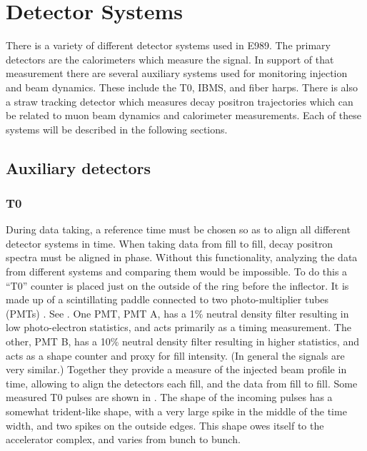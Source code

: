 
\thispagestyle{myheadings}

\graphicspath{{Body/Figures/ExperimentalOverview/Auxiliary/}{Body/Figures/ExperimentalOverview/Calorimeter/}{Body/Figures/ExperimentalOverview/Ring/}{Body/Figures/TrackingFigures/TrackerPics/}{Body/Figures/ExperimentalOverview/Ring/}{Body/Figures/TrackingFigures/CoordSys/}{Body/Figures/TrackingFigures/Drift/}{Body/Figures/TrackingFigures/Electronics/}}

\chapter{Detector Systems}
\label{sec:DetectorSystems}

There is a variety of different detector systems used in E989. The primary detectors are the calorimeters which measure the \wa signal. In support of that measurement there are several auxiliary systems used for monitoring injection and beam dynamics. These include the T0, IBMS, and fiber harps. There is also a straw tracking detector which measures decay positron trajectories which can be related to muon beam dynamics and calorimeter measurements. Each of these systems will be described in the following sections.



\section{Auxiliary detectors}

\subsection{T0}
\label{sec:T0}

During data taking, a reference time must be chosen so as to align all different detector systems in time. When taking data from fill to fill, decay positron spectra must be aligned in phase. Without this functionality, analyzing the data from different systems and comparing them would be impossible. To do this a ``T0'' counter is placed just on the outside of the ring before the inflector. It is made up of a scintillating paddle connected to two photo-multiplier tubes (PMTs) \cite{t0Hannah,t0Aaron}. See . One PMT, PMT A, has a 1\% neutral density filter resulting in low photo-electron statistics, and acts primarily as a timing measurement. The other, PMT B, has a 10\% neutral density filter resulting in higher statistics, and acts as a shape counter and proxy for fill intensity. (In general the signals are very similar.) Together they provide a measure of the injected beam profile in time, allowing to align the detectors each fill, and the data from fill to fill. Some measured T0 pulses are shown in . The shape of the incoming pulses has a somewhat trident-like shape, with a very large spike in the middle of the time width, and two spikes on the outside edges. This shape owes itself to the accelerator complex, and varies from bunch to bunch.


